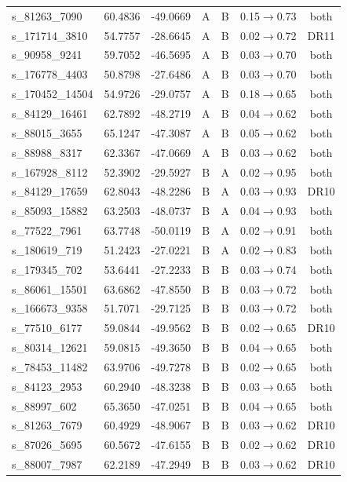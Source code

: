 {\begin{longtable}{lcccccc}
s\_81263\_7090 & 60.4836 & -49.0669 & A & B & 0.15$\to$0.73 & both\\
s\_171714\_3810 & 54.7757 & -28.6645 & A & B & 0.02$\to$0.72 & DR11\\
s\_90958\_9241 & 59.7052 & -46.5695 & A & B & 0.03$\to$0.70 & both\\
s\_176778\_4403 & 50.8798 & -27.6486 & A & B & 0.03$\to$0.70 & both\\
s\_170452\_14504 & 54.9726 & -29.0757 & A & B & 0.18$\to$0.65 & both\\
s\_84129\_16461 & 62.7892 & -48.2719 & A & B & 0.04$\to$0.62 & both\\
s\_88015\_3655 & 65.1247 & -47.3087 & A & B & 0.05$\to$0.62 & both\\
s\_88988\_8317 & 62.3367 & -47.0669 & A & B & 0.03$\to$0.62 & both\\
s\_167928\_8112 & 52.3902 & -29.5927 & B & A & 0.02$\to$0.95 & both\\
s\_84129\_17659 & 62.8043 & -48.2286 & B & A & 0.03$\to$0.93 & DR10\\
s\_85093\_15882 & 63.2503 & -48.0737 & B & A & 0.04$\to$0.93 & both\\
s\_77522\_7961 & 63.7748 & -50.0119 & B & A & 0.02$\to$0.91 & both\\
s\_180619\_719 & 51.2423 & -27.0221 & B & A & 0.02$\to$0.83 & both\\
s\_179345\_702 & 53.6441 & -27.2233 & B & B & 0.03$\to$0.74 & both\\
s\_86061\_15501 & 63.6862 & -47.8550 & B & B & 0.03$\to$0.72 & both\\
s\_166673\_9358 & 51.7071 & -29.7125 & B & B & 0.03$\to$0.72 & both\\
s\_77510\_6177 & 59.0844 & -49.9562 & B & B & 0.02$\to$0.65 & DR10\\
s\_80314\_12621 & 59.0815 & -49.3650 & B & B & 0.04$\to$0.65 & both\\
s\_78453\_11482 & 63.9706 & -49.7278 & B & B & 0.02$\to$0.65 & both\\
s\_84123\_2953 & 60.2940 & -48.3238 & B & B & 0.03$\to$0.65 & both\\
s\_88997\_602 & 65.3650 & -47.0251 & B & B & 0.04$\to$0.65 & both\\
s\_81263\_7679 & 60.4929 & -48.9067 & B & B & 0.03$\to$0.62 & DR10\\
s\_87026\_5695 & 60.5672 & -47.6155 & B & B & 0.02$\to$0.62 & DR10\\
s\_88007\_7987 & 62.2189 & -47.2949 & B & B & 0.03$\to$0.62 & DR10\\

\end{longtable}}
